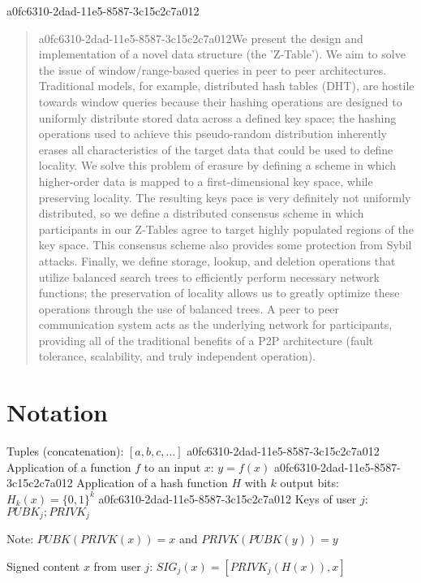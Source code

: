 \documentclass[12pt]{article}
\begin{document}
\maketitle
a0fc6310-2dad-11e5-8587-3c15c2c7a012
\begin{abstract}
a0fc6310-2dad-11e5-8587-3c15c2c7a012We present the design and implementation of a novel data structure (the 'Z-Table'). We aim to solve the issue of window/range-based queries in peer to peer architectures. Traditional models, for example,  distributed hash tables (DHT), are hostile towards window queries because their hashing operations are designed to uniformly distribute stored data across a defined key space; the hashing operations used to achieve this pseudo-random distribution inherently erases all characteristics of the target data that could be used to define locality. We solve this problem of erasure by defining a scheme in which higher-order data is mapped to a first-dimensional key space, while preserving locality. The resulting keys pace is very definitely not uniformly distributed, so we define a distributed consensus scheme in which participants in our Z-Tables agree to target highly populated regions of the key space. This consensus scheme also provides some protection from Sybil attacks. Finally, we define storage, lookup, and deletion operations that utilize balanced search trees to efficiently perform necessary network functions; the preservation of locality allows us to greatly optimize these operations through the use of balanced trees. A peer to peer communication system acts as the underlying network for participants, providing all of the traditional benefits of a P2P architecture (fault tolerance, scalability, and truly independent operation).
\end{abstract}

\section{Notation}

Tuples (concatenation): $[a,b,c,...]$
a0fc6310-2dad-11e5-8587-3c15c2c7a012
Application of a function $f$ to an input $x$: $y=f(x)$
a0fc6310-2dad-11e5-8587-3c15c2c7a012
Application of a hash function $H$ with $k$ output bits: $H_{k}(x) = \{0,1\}^k$
a0fc6310-2dad-11e5-8587-3c15c2c7a012
Keys of user $j$: $ PUBK_j; PRIVK_j $

Note: $PUBK(PRIVK(x)) = x$ and $PRIVK(PUBK(y)) = y$~

Signed content $x$ from user $j$: $SIG_j(x) = \left[ PRIVK_j( H(x) ), x \right]$
\end{document}
